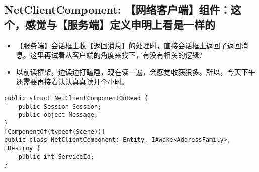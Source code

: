 \documentclass[9pt, b5paper]{article}
\begin{document}
\subsection{NetClientComponent: 【网络客户端】组件：这个，感觉与【服务端】定义申明上看是一样的}
\label{sec-6-6}
\begin{itemize}
\item 【服务端】会话框上收【返回消息】的处理时，直接会话框上返回了返回消息。这里再试着从客户端的角度来找下，有没有相关的逻辑?
\item 以前读框架，边读边打瞌睡，现在读一遍，会感觉收获狠多。所以，今天下午还需要再接着认认真真读几个小时。
\end{itemize}
\begin{verbatim}
public struct NetClientComponentOnRead {
    public Session Session;
    public object Message;
}
[ComponentOf(typeof(Scene))]
public class NetClientComponent: Entity, IAwake<AddressFamily>, IDestroy {
    public int ServiceId;
}
\end{verbatim}
\end{document}
